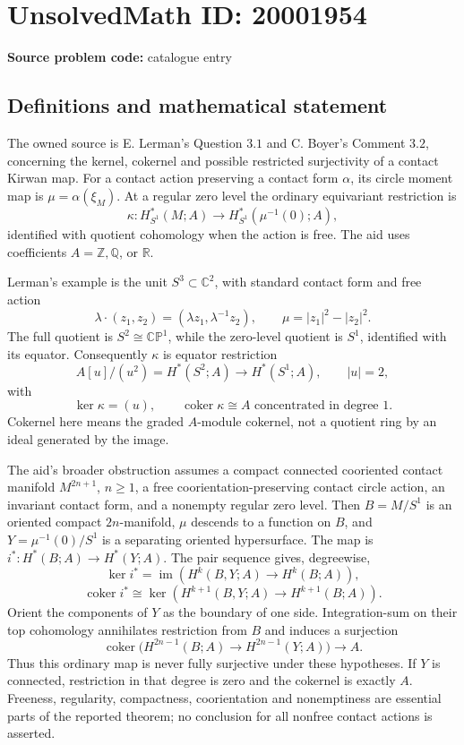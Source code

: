 \documentclass[11pt]{article}
\newcommand{\Z}{\mathbb{Z}}
\newcommand{\Q}{\mathbb{Q}}
\newcommand{\R}{\mathbb{R}}
\newcommand{\C}{\mathbb{C}}
\begin{document}
\section*{UnsolvedMath ID: 20001954}
\textbf{Source problem code:} catalogue entry
\subsection{Definitions and mathematical statement}
The owned source is E. Lerman's Question \(3.1\) and C. Boyer's Comment \(3.2\), concerning the kernel, cokernel and possible restricted surjectivity of a contact Kirwan map. For a contact action preserving a contact form \(\alpha\), its circle moment map is \(\mu=\alpha(\xi_M)\). At a regular zero level the ordinary equivariant restriction is
\[
 \kappa:H_{S^1}^*(M;A)\longrightarrow H_{S^1}^*(\mu^{-1}(0);A),
\]
identified with quotient cohomology when the action is free. The aid uses coefficients \(A=\Z,\Q\), or \(\R\).

Lerman's example is the unit \(S^3\subset\C^2\), with standard contact form and free action
\[
 \lambda\cdot(z_1,z_2)=(\lambda z_1,\lambda^{-1}z_2),\qquad
 \mu=|z_1|^2-|z_2|^2.
\]
The full quotient is \(S^2\cong\mathbb{CP}^1\), while the zero-level quotient is \(S^1\), identified with its equator. Consequently \(\kappa\) is equator restriction
\[
 A[u]/(u^2)=H^*(S^2;A)\longrightarrow H^*(S^1;A),\qquad |u|=2,
\]
with
\[
 \ker\kappa=(u),\qquad \operatorname{coker}\kappa\cong A
       \text{ concentrated in degree }1.
\]
Cokernel here means the graded \(A\)-module cokernel, not a quotient ring by an ideal generated by the image.

The aid's broader obstruction assumes a compact connected cooriented contact manifold \(M^{2n+1}\), \(n\geq1\), a free coorientation-preserving contact circle action, an invariant contact form, and a nonempty regular zero level. Then \(B=M/S^1\) is an oriented compact \(2n\)-manifold, \(\mu\) descends to a function on \(B\), and \(Y=\mu^{-1}(0)/S^1\) is a separating oriented hypersurface. The map is \(i^*:H^*(B;A)\to H^*(Y;A)\). The pair sequence gives, degreewise,
\[
 \ker i^*=\operatorname{im}(H^k(B,Y;A)\to H^k(B;A)),
\]
\[
 \operatorname{coker}i^*\cong
 \ker(H^{k+1}(B,Y;A)\to H^{k+1}(B;A)).
\]
Orient the components of \(Y\) as the boundary of one side. Integration-sum on their top cohomology annihilates restriction from \(B\) and induces a surjection
\[
 \operatorname{coker}\bigl(H^{2n-1}(B;A)\to H^{2n-1}(Y;A)\bigr)
 \longrightarrow A.
\]
Thus this ordinary map is never fully surjective under these hypotheses. If \(Y\) is connected, restriction in that degree is zero and the cokernel is exactly \(A\). Freeness, regularity, compactness, coorientation and nonemptiness are essential parts of the reported theorem; no conclusion for all nonfree contact actions is asserted.
\end{document}
